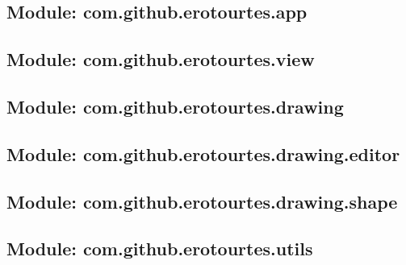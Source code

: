 \subsection{Module: com.github.erotourtes.app}


\subsection{Module: com.github.erotourtes.view}

\subsection{Module: com.github.erotourtes.drawing}



\subsection{Module: com.github.erotourtes.drawing.editor}




\subsection{Module: com.github.erotourtes.drawing.shape}



\subsection{Module: com.github.erotourtes.utils}



